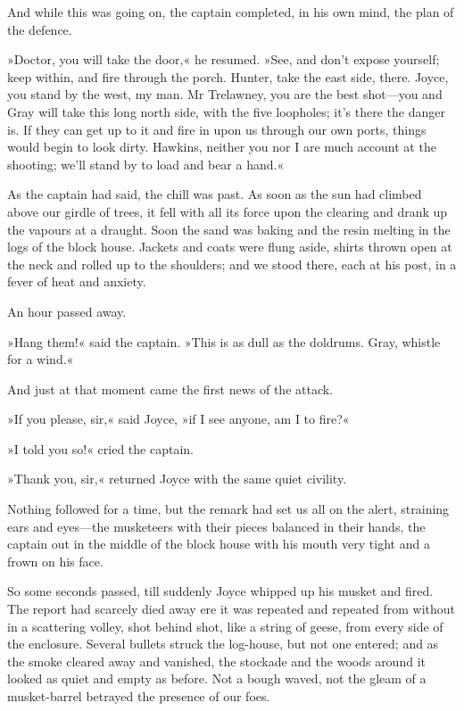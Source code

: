 And while this was going on, the captain completed, in his own mind, the plan of the defence.

»Doctor, you will take the door,« he resumed. »See, and don't expose yourself; keep within, and fire through the porch. Hunter, take the east side, there. Joyce, you stand by the west, my man. Mr Trelawney, you are the best shot—you and Gray will take this long north side, with the five loopholes; it's there the danger is. If they can get up to it and fire in upon us through our own ports, things would begin to look dirty. Hawkins, neither you nor I are much account at the shooting; we'll stand by to load and bear a hand.«

As the captain had said, the chill was past. As soon as the sun had climbed above our girdle of trees, it fell with all its force upon the clearing and drank up the vapours at a draught. Soon the sand was baking and the resin melting in the logs of the block house. Jackets and coats were flung aside, shirts thrown open at the neck and rolled up to the shoulders; and we stood there, each at his post, in a fever of heat and anxiety.

An hour passed away.

»Hang them!« said the captain. »This is as dull as the doldrums. Gray, whistle for a wind.«

And just at that moment came the first news of the attack.

»If you please, sir,« said Joyce, »if I see anyone, am I to fire?«

»I told you so!« cried the captain.

»Thank you, sir,« returned Joyce with the same quiet civility.

Nothing followed for a time, but the remark had set us all on the alert, straining ears and eyes—the musketeers with their pieces balanced in their hands, the captain out in the middle of the block house with his mouth very tight and a frown on his face.

So some seconds passed, till suddenly Joyce whipped up his musket and fired. The report had scarcely died away ere it was repeated and repeated from without in a scattering volley, shot behind shot, like a string of geese, from every side of the enclosure. Several bullets struck the log-house, but not one entered; and as the smoke cleared away and vanished, the stockade and the woods around it looked as quiet and empty as before. Not a bough waved, not the gleam of a musket-barrel betrayed the presence of our foes.

